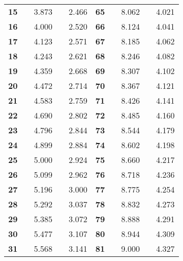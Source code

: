 \begin{tabular}{|>{\bfseries}r|r|d{3}|r|d{3}||>{\bfseries}r|r|d{3}|r|d{3}|}
   15 &  & 3.873 &  & 2.466 &    65 &  & 8.062 &  & 4.021 \\
   16 &  & 4.000 &  & 2.520 &    66 &  & 8.124 &  & 4.041 \\
   17 &  & 4.123 &  & 2.571 &    67 &  & 8.185 &  & 4.062 \\
   18 &  & 4.243 &  & 2.621 &    68 &  & 8.246 &  & 4.082 \\
   19 &  & 4.359 &  & 2.668 &    69 &  & 8.307 &  & 4.102 \\
   20 &  & 4.472 &  & 2.714 &    70 &  & 8.367 &  & 4.121 \\
   21 &  & 4.583 &  & 2.759 &    71 &  & 8.426 &  & 4.141 \\
   22 &  & 4.690 &  & 2.802 &    72 &  & 8.485 &  & 4.160 \\
   23 &  & 4.796 &  & 2.844 &    73 &  & 8.544 &  & 4.179 \\
   24 &  & 4.899 &  & 2.884 &    74 &  & 8.602 &  & 4.198 \\
   25 &  & 5.000 &  & 2.924 &    75 &  & 8.660 &  & 4.217 \\
   26 &  & 5.099 &  & 2.962 &    76 &  & 8.718 &  & 4.236 \\
   27 &  & 5.196 &  & 3.000 &    77 &  & 8.775 &  & 4.254 \\
   28 &  & 5.292 &  & 3.037 &    78 &  & 8.832 &  & 4.273 \\
   29 &  & 5.385 &  & 3.072 &    79 &  & 8.888 &  & 4.291 \\
   30 &  & 5.477 &  & 3.107 &    80 &  & 8.944 &  & 4.309 \\
   31 &  & 5.568 &  & 3.141 &    81 &  & 9.000 &  & 4.327 \\

\end{tabular}
